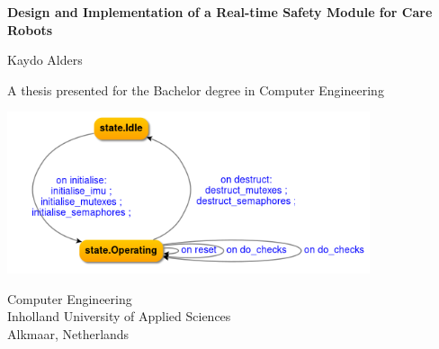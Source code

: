 \documentclass[12pt]{scrreprt}
\date{\displaydate{date}}
\begin{document}

\lstset{escapechar=@,style=customc}

\begin{titlepage}
    \begin{center}
        \vspace*{1cm}
            
        \LARGE
        \textbf{Design and Implementation of a Real-time Safety Module for Care Robots}
            
        \vspace{0.5cm}
            
        \vspace{1.5cm}
            
        Kaydo Alders
            
        \vfill
            
        A thesis presented for the Bachelor degree in Computer Engineering
            
        \vspace{0.8cm}
            
        \includegraphics[width=0.8\textwidth]{Figures/results/modelling_figures/IController/IController_state_chart.png}
        
        \vspace{0.8cm}
        
        \Large
        Computer Engineering\\
        Inholland University of Applied Sciences\\
        Alkmaar, Netherlands\\
        \large {}
            
    \end{center}
\end{titlepage}
\end{document}
